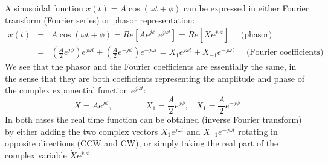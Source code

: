 \documentclass{article}
\begin{document}
A sinusoidal function $x(t)=A\cos(\omega t+\phi)$ can be expressed in
either Fourier transform (Fourier series) or phasor representation:
\begin{eqnarray}
  x(t)&=&A\cos(\omega t+\phi)=Re[Ae^{j\phi}\;e^{j\omega t}]=Re[\dot{X} e^{j\omega t}]
  \;\;\;\;\;\mbox{(phasor)}
  \nonumber \\
  &=&\left(\frac{A}{2}e^{j\phi}\right)e^{j\omega t}
  +\left(\frac{A}{2}e^{-j\phi}\right)e^{-j\omega t}
  =X_1 e^{j\omega t}+X_{-1}e^{-j\omega t}\;\;\;\;\;\mbox{(Fourier coefficients)}
\end{eqnarray}
We see that the phasor and the Fourier coefficients are essentially 
the same, in the sense that they are both coefficients representing the 
amplitude and phase of the complex exponential function $e^{j\omega t}$:
\begin{equation}
  \dot{X}=Ae^{j\phi},\;\;\;\;\;\;\;\;\;\;\;\;\;\;
  X_1=\frac{A}{2}e^{j\phi},\;\;\;X_1=\frac{A}{2}e^{-j\phi}
\end{equation}
In both cases the real time function can be obtained (inverse Fourier
transform) by either adding the two complex vectors $X_1e^{j\omega t}$ and 
$X_{-1}e^{-j\omega t}$ rotating in opposite directions (CCW and CW), or simply
taking the real part of the complex variable $\dot{X}e^{j\omega t}$

\begin{comment}
According to the Fourier theory, any time function (satisfying certain 
mathematical conditions) $x(t)$ can be decomposed into a linear combination
of sinusoidal (complex exponential) components:
\begin{itemize}
\item If $x(t)=x(t+T)$ is periodical with period $T$, it can be Fourier
  expanded into
  \begin{equation}
    x_T(t)=\sum_{k=-\infty}^\infty X[k] e^{jk\omega_0t},\;\;\;\;\;\;(\omega_0=2\pi/T)
  \end{equation}
  where $X[k]$ is the complex coefficient of the kth frequency component
  \begin{equation}
    X[k]=\frac{1}{T}\int_T x_T(t)e^{-jk\omega_0t}
  \end{equation}
  When $x_T(t)$ is real, the above becomes:
  \begin{equation}
    x_T(t)=X[0]+2\sum_{k=1}^\infty |X[k]|\cos(k\omega_0 t+\angle X[k])
  \end{equation}
\item If $x(t)$ is not periodical, i.e., $T=\infty$, it can be expressed as
  \begin{equation}
    x(t)=\frac{1}{2\pi} \int X(\omega) e^{j\omega t} d\omega
  \end{equation}
  where $X(\omega)$ is the {\em Fourier spectrum} of the signal representing
  how the signal energy is distributed as a function of continuous frequency:
  \begin{equation}
    X(\omega)=\int_{-\infty}^\infty x(t) e^{-j\omega t}\;dt
  \end{equation}
\end{itemize}
\end{comment}
\end{document}
